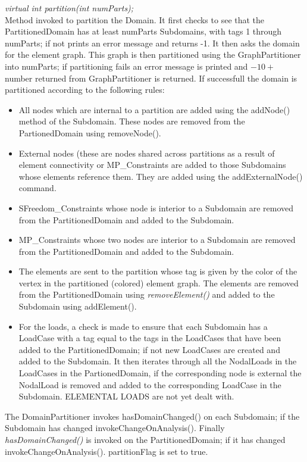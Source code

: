 {\em virtual int partition(int numParts);}\\
Method invoked to partition the Domain. It first checks to see that
the PartitionedDomain has at least \p numParts Subdomains, with tags
1 through \p numParts; if not prints an error message and returns -1. 
It then asks the domain for the element graph. This graph is then partitioned 
using the GraphPartitioner into \p numParts; if partitioning fails an error 
message is printed and  $-10 +$ number returned from GraphPartitioner is
returned. If successfull the domain is partitioned according to the
following rules: \begin{itemize}
\item All nodes which are internal to a partition are added using the
addNode() method of the Subdomain. These nodes are removed from
the PartionedDomain using removeNode(). 
\item External nodes (these are nodes shared across partitions as a
result of element connectivity or MP\_Constraints are added to those
Subdomains whose elements reference them. They are added using the
addExternalNode() command. 
\item SFreedom\_Constraints whose node is interior to a Subdomain are removed
from the PartitionedDomain and added to the Subdomain. 
\item MP\_Constraints whose two nodes are interior to a Subdomain are
removed from the PartitionedDomain and added to the Subdomain.
\item The elements are sent to the partition whose tag is given by the
color of the vertex in the partitioned (colored) element graph. The
elements are removed from the PartitionedDomain using {\em
removeElement()} and added to the Subdomain using addElement().
\item For the loads, a check is made to ensure that each Subdomain has
a LoadCase with a tag equal to the tags in the LoadCases that have
been added to the PartitionedDomain; if not new LoadCases are created
and added to the Subdomain. It then iterates through all the
NodalLoads in the LoadCases in the PartionedDomain, if the
corresponding node is external the NodalLoad is removed and added to
the corresponding LoadCase in the Subdomain. ELEMENTAL LOADS are not
yet dealt with. 
\end{itemize}

The DomainPartitioner invokes hasDomainChanged() on each Subdomain; if the Subdomain 
has changed invokeChangeOnAnalysis(). Finally {\em
hasDomainChanged()} is invoked on the PartitionedDomain; if it has
changed invokeChangeOnAnalysis(). \p partitionFlag is set to
true. \\ 


